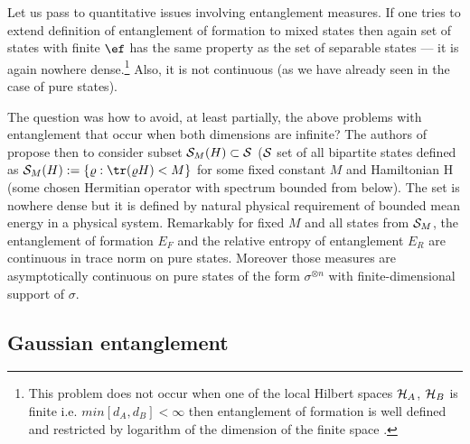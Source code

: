 \documentclass[rmp,12pt,preprint]{revtex4-2}
\begin{document}
Let us pass to quantitative issues involving entanglement
measures. If one tries to extend definition of entanglement of
formation to mixed states \cite{InfiniteEntanglementEisert} then again
set of states with finite $\ef$ has the same property as the set of
separable states --- it is again nowhere dense.\footnote{This problem
  does not occur when one of the local Hilbert spaces ${\cal H}_{A}$,
  ${\cal H}_{B}$ is finite i.e. $min[d_{A},d_{B}] <\infty$ then
  entanglement of formation is well defined and restricted by
  logarithm of the dimension of the finite space
  \cite{MajewskiJPA2002}.} Also, it is not continuous (as we have
already seen in the case of pure states).

The question was how to avoid, at least partially, the above problems
with entanglement that occur when both dimensions are infinite? The
authors of \cite{InfiniteEntanglementEisert} propose then to consider
subset ${\cal S}_{M}(H) \subset {\cal S}$ (${\cal S}$ set of all
bipartite states defined as ${\cal S}_{M}(H):= \{ \varrho:
{\tr}(\varrho H)< M \}$ for some fixed constant $M$ and Hamiltonian H
(some chosen Hermitian operator with spectrum bounded from below). The
set is nowhere dense but it is defined by natural physical requirement
of bounded mean energy in a physical system.  Remarkably for fixed $M$
and all states from ${\cal S}_{M}$, the entanglement of formation
$E_{F}$ and the relative entropy of entanglement $E_R$ are continuous
in trace norm on pure states.  Moreover those measures are
asymptotically continuous on pure states of the form $\sigma^{\otimes
  n}$ with finite-dimensional support of $\sigma $.



\subsection{Gaussian entanglement}
\end{document}
